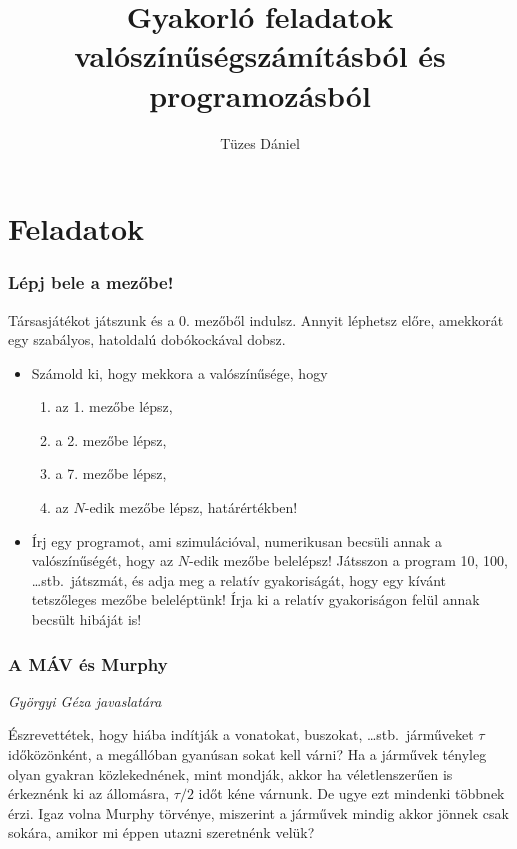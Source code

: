 \documentclass[12pt,a4paper]{article}
\begin{document}
\title{Gyakorló feladatok valószínűségszámításból és programozásból}
\author{Tüzes Dániel}
\maketitle
\tableofcontents

\part{Feladatok}

\section{Lépj bele a mezőbe!}
Társasjátékot játszunk és a 0. mezőből indulsz. Annyit léphetsz előre, amekkorát egy szabályos, hatoldalú dobókockával dobsz.

\begin{itemize}
  \item Számold ki, hogy mekkora a valószínűsége, hogy
        \begin{enumerate}
          \item az 1. mezőbe lépsz,
          \item a 2. mezőbe lépsz,
          \item a 7. mezőbe lépsz,
          \item az $N$-edik mezőbe lépsz, határértékben!
        \end{enumerate}
  \item Írj egy programot, ami szimulációval, numerikusan becsüli annak a valószínűségét, hogy az $N$-edik mezőbe belelépsz! Játsszon a program 10, 100, \ldots stb.\ játszmát, és adja meg a relatív gyakoriságát, hogy egy kívánt tetszőleges mezőbe beleléptünk! Írja ki a relatív gyakoriságon felül annak becsült hibáját is!
\end{itemize}

\section{A MÁV és Murphy}
\textit{Györgyi Géza javaslatára}

Észrevettétek, hogy hiába indítják a vonatokat, buszokat, \ldots stb.\ járműveket $\tau$ időközönként, a megállóban gyanúsan sokat kell várni? Ha a járművek tényleg olyan gyakran közlekednének, mint mondják, akkor ha véletlenszerűen is érkeznénk ki az állomásra, $\tau/2$ időt kéne várnunk. De ugye ezt mindenki többnek érzi. Igaz volna Murphy törvénye, miszerint a járművek mindig akkor jönnek csak sokára, amikor mi éppen utazni szeretnénk velük?
\end{document}
